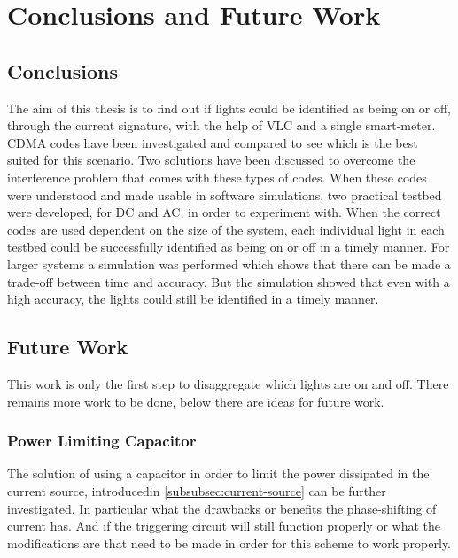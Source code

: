 
\chapter{Conclusions and Future Work}
\label{chp:conclusionsandfuturework}

\section{Conclusions}


The aim of this thesis is to find out if lights could be identified as being on or off, through the current signature, with the help of VLC and a single smart-meter.
CDMA codes have been investigated and compared to see which is the best suited for this scenario.
Two solutions have been discussed to overcome the interference problem that comes with these types of codes.
When these codes were understood and made usable in software simulations, two practical testbed were developed, for DC and AC, in order to experiment with.
When the correct codes are used dependent on the size of the system, each individual light in each testbed could be successfully identified as being on or off in a timely manner.
For larger systems a simulation was performed which shows that there can be made a trade-off between time and accuracy. 
But the simulation showed that even with a high accuracy, the lights could still be identified in a timely manner.






\section{Future Work}


This work is only the first step to disaggregate which lights are on and off.
There remains more work to be done, below there are ideas for future work.

	\subsection{Power Limiting Capacitor}

	The solution of using a capacitor in order to limit the power dissipated in the current source, introducedin \autoref{subsubsec:current-source} can be further investigated.
	In particular what the drawbacks or benefits the phase-shifting of current has.
	And if the triggering circuit will still function properly or what the modifications are that need to be made in order for this scheme to work properly.


